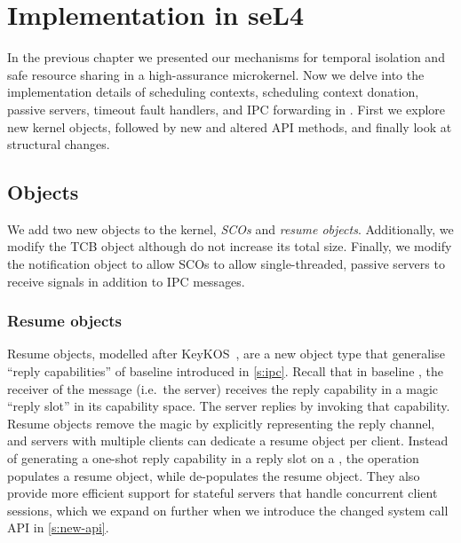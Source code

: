 \chapter{Implementation in seL4}
\label{chap:implementation}

In the previous chapter we presented our mechanisms for temporal isolation and safe resource sharing
in a high-assurance microkernel. 
Now we delve into the implementation details of scheduling contexts, scheduling context donation,
passive servers, timeout fault handlers, and IPC forwarding in \selfour. First we explore new kernel
objects, followed by new and altered API methods, and finally look at structural changes.

\section{Objects}

We add two new objects to the kernel, \emph{\glspl{SCO}} and \emph{resume objects}. Additionally, we modify
the \gls{TCB} object although do not increase its total size. Finally, we modify the notification
object to allow \glspl{SCO} to allow single-threaded, passive servers to receive signals in
addition to IPC messages.

\subsection{Resume objects}
\label{s:resume}

Resume objects, modelled after KeyKOS~\citep{Bomberger_FFHLS_92}, are a new object type that
generalise ``reply capabilities'' of baseline \selfour introduced in \cref{s:ipc}.  Recall that in
baseline \selfour, the receiver of the message (i.e.\ the server) receives the reply capability in a
magic ``reply slot'' in its capability space. The server replies by invoking that capability. Resume
objects remove the magic by explicitly representing the reply channel, and servers with multiple
clients can dedicate a resume object per client.  Instead of generating a one-shot reply capability
in a reply slot on a \call, the operation populates a resume object, while \recv de-populates the
resume object.  They also provide more efficient support for stateful servers that handle concurrent
client sessions, which we expand on further when we introduce the changed system call \gls{API} in
\cref{s:new-api}.

